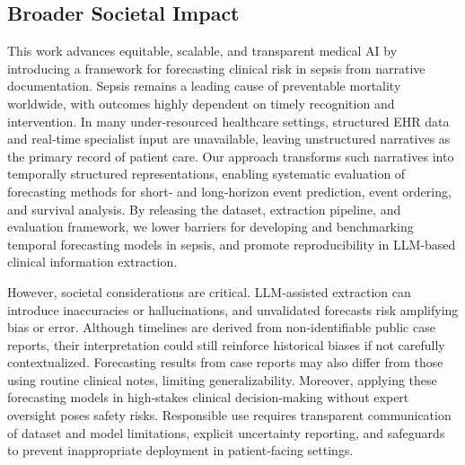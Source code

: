 \subsection{Broader Societal Impact}
\label{ch07:apd:broader_impact}

This work advances equitable, scalable, and transparent medical AI by introducing a framework for forecasting clinical risk in sepsis from narrative documentation.
Sepsis remains a leading cause of preventable mortality worldwide, with outcomes highly dependent on timely recognition and intervention.
In many under‑resourced healthcare settings, structured EHR data and real‑time specialist input are unavailable, leaving unstructured narratives as the primary record of patient care.
Our approach transforms such narratives into temporally structured representations, enabling systematic evaluation of forecasting methods for short‑ and long‑horizon event prediction, event ordering, and survival analysis.
By releasing the dataset, extraction pipeline, and evaluation framework, we lower barriers for developing and benchmarking temporal forecasting models in sepsis, and promote reproducibility in LLM‑based clinical information extraction.

However, societal considerations are critical.
LLM‑assisted extraction can introduce inaccuracies or hallucinations, and unvalidated forecasts risk amplifying bias or error.
Although timelines are derived from non‑identifiable public case reports, their interpretation could still reinforce historical biases if not carefully contextualized.
Forecasting results from case reports may also differ from those using routine clinical notes, limiting generalizability.
Moreover, applying these forecasting models in high‑stakes clinical decision‑making without expert oversight poses safety risks.
Responsible use requires transparent communication of dataset and model limitations, explicit uncertainty reporting, and safeguards to prevent inappropriate deployment in patient‑facing settings.


